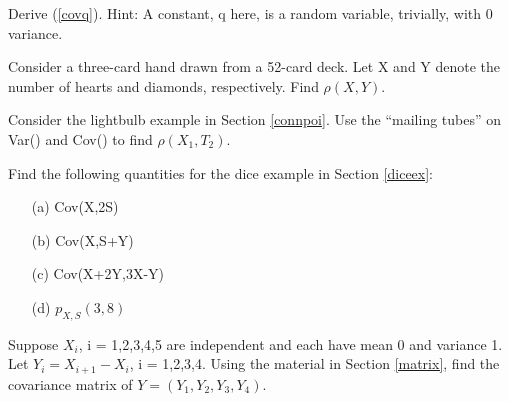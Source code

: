 \oneproblem
Derive (\ref{covq}).  Hint: A constant, q here, is a random variable,
trivially, with 0 variance.

\oneproblem
Consider a three-card hand drawn from a 52-card deck. Let X and Y
denote the number of hearts and diamonds, respectively. Find
$\rho(X,Y)$.

\oneproblem
Consider the lightbulb example in Section \ref{connpoi}. Use the
``mailing tubes'' on Var() and Cov() to find $\rho(X_1,T_2)$.

\oneproblem
Find the following quantities for the dice example in Section
\ref{diceex}:

\begin{itemize}

\item [(a)] Cov(X,2S)

\item [(b)] Cov(X,S+Y)

\item [(c)] Cov(X+2Y,3X-Y)

\item [(d)] $p_{X,S}(3,8)$

\end{itemize}

\oneproblem
Suppose $X_i$, i = 1,2,3,4,5 are independent and each have mean 0 and
variance 1.  Let $Y_i = X_{i+1} - X_i$, i = 1,2,3,4.  Using the
material in Section \ref{matrix}, find the covariance matrix of
$Y = (Y_1, Y_2, Y_3, Y_4)$.

